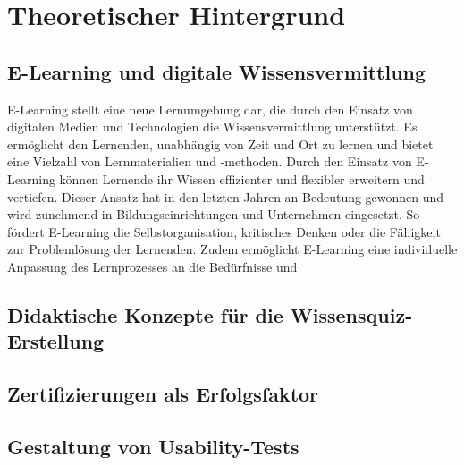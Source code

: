 \chapter{Theoretischer Hintergrund}
\section{E-Learning und digitale Wissensvermittlung}
E-Learning stellt eine neue Lernumgebung dar, die durch den Einsatz von digitalen Medien und 
Technologien die Wissensvermittlung unterstützt. Es ermöglicht den Lernenden, unabhängig von Zeit und 
Ort zu lernen und bietet eine Vielzahl von Lernmaterialien und -methoden. %
Durch den Einsatz von E-Learning können Lernende ihr Wissen effizienter und flexibler erweitern und vertiefen. %
Dieser Ansatz hat in den letzten Jahren an Bedeutung gewonnen und wird zunehmend in 
Bildungseinrichtungen und Unternehmen eingesetzt. So fördert E-Learning die Selbstorganisation, kritisches
Denken oder die Fähigkeit zur Problemlösung der Lernenden. %
Zudem ermöglicht E-Learning eine individuelle Anpassung des Lernprozesses an die Bedürfnisse und 
\section{Didaktische Konzepte für die Wissensquiz-Erstellung}
\section{Zertifizierungen als Erfolgsfaktor}
\section{Gestaltung von Usability-Tests}